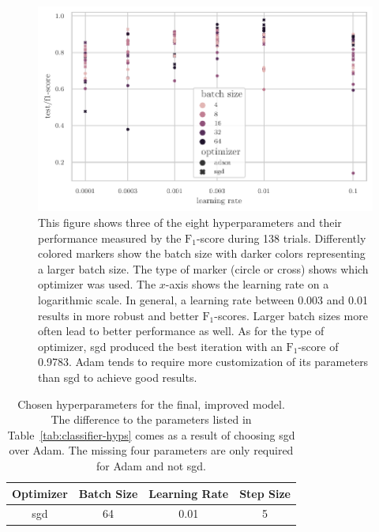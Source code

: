 \documentclass[final]{vutinfth} %
\begin{document}
\begin{figure}
  \centering
  \includegraphics{graphics/classifier-hyp-metrics.pdf}
  \caption[Classifier hyperparameter optimization results.]{This
    figure shows three of the eight hyperparameters and their
    performance measured by the $\mathrm{F}_1$-score during \num{138}
    trials. Differently colored markers show the batch size with
    darker colors representing a larger batch size. The type of marker
    (circle or cross) shows which optimizer was used. The $x$-axis
    shows the learning rate on a logarithmic scale. In general, a
    learning rate between \num{0.003} and \num{0.01} results in more
    robust and better $\mathrm{F}_1$-scores. Larger batch sizes more
    often lead to better performance as well. As for the type of
    optimizer, \gls{sgd} produced the best iteration with an
    $\mathrm{F}_1$-score of \num{0.9783}. Adam tends to require more
    customization of its parameters than \gls{sgd} to achieve good
    results.}
  \label{fig:classifier-hyp-results}
\end{figure}

\begin{table}
  \centering
  \begin{tabular}{cccc}
    \toprule
    Optimizer &  Batch Size & Learning Rate & Step Size \\
    \midrule
    \gls{sgd} & 64 & 0.01 & 5\\
    \bottomrule
  \end{tabular}
  \caption[Hyperparameters for the optimized classifier.]{Chosen
    hyperparameters for the final, improved model. The difference to
    the parameters listed in Table~\ref{tab:classifier-hyps} comes as
    a result of choosing \gls{sgd} over Adam. The missing four
    parameters are only required for Adam and not \gls{sgd}.}
  \label{tab:classifier-final-hyps}
\end{table}
\end{document}
